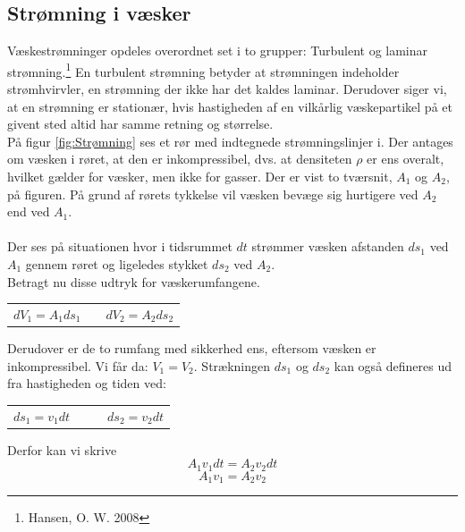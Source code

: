 \documentclass[a4paper, 11pt]{article}
\begin{document}
\subsection{Strømning i væsker}
Væskestrømninger opdeles overordnet set i to grupper: Turbulent og laminar strømning.\footnote{Hansen, O. W. 2008}
En turbulent strømning betyder at strømningen indeholder strømhvirvler, en strømning der ikke har det kaldes laminar.
Derudover siger vi, at en strømning er stationær, hvis hastigheden af en vilkårlig væskepartikel på et givent sted altid har samme retning og størrelse.
\\
På figur \ref*{fig:Strømning} ses et rør med indtegnede strømningslinjer i. Der antages om væsken i røret, at den er inkompressibel, 
dvs. at densiteten \(\rho\) er ens overalt, hvilket gælder for væsker, men ikke for gasser.
Der er vist to tværsnit, \(A_1\) og \(A_2\), på figuren. På grund af rørets tykkelse vil væsken bevæge sig hurtigere ved \(A_2\) end ved \(A_1\).\\\\
Der ses på situationen hvor i tidsrummet \(dt\) strømmer væsken afstanden \(ds_1\) ved \(A_1\) gennem røret og ligeledes stykket \(ds_2\) ved \(A_2\).\\
Betragt nu disse udtryk for væskerumfangene.
\begin{center}
    \begin{tabular}{ l c l }
     \(dV_1=A_1ds_1\) & & \(dV_2=A_2ds_2\)
    \end{tabular}
\end{center}
Derudover er de to rumfang med sikkerhed ens, eftersom væsken er inkompressibel. Vi får da: \(V_1 = V_2\). Strækningen \(ds_1\) og \(ds_2\) kan også defineres ud fra hastigheden og tiden ved:
\begin{center}
    \begin{tabular}{ l c c l }
     \(ds_1=v_1dt\) & & & \(ds_2=v_2dt\)
    \end{tabular}
\end{center}
Derfor kan vi skrive
\[A_1v_1dt = A_2v_2dt\]
\begin{equation}
    A_1v_1=A_2v_2
\end{equation}
\end{document}
